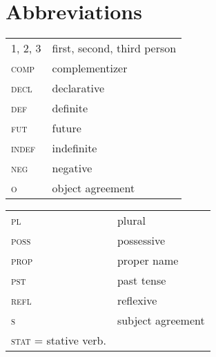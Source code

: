 \documentclass[output=paper]{LSP/langsci}
\begin{document}
\section*{Abbreviations}
\begin{tabularx}{.45\textwidth}{lX}
1, 2, 3 & first, second, third person\\
\textsc{comp} & complementizer \\
 \textsc{decl} & declarative \\
 \textsc{def} & definite \\
 \textsc{fut} & future \\
 \textsc{indef} & indefinite \\
 \textsc{neg} & negative \\
 \textsc{o} & object agreement \\
\end{tabularx}
\begin{tabularx}{.45\textwidth}{lX}
 \textsc{pl} & plural \\
 \textsc{poss} & possessive \\
 \textsc{prop} & proper name \\
 \textsc{pst} & past tense \\
 \textsc{refl} & reflexive \\
 \textsc{s} & {subject} agreement \\
 \textsc{stat} = stative verb.
\end{tabularx}

{\sloppy
 \printbibliography[heading=subbibliography,notkeyword=this]
}
\end{document}

